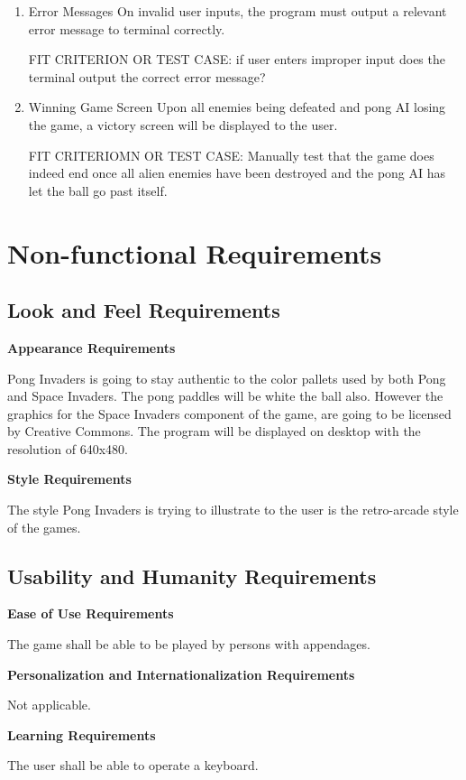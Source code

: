 \documentclass[12pt, titlepage]{article}
\begin{document}
\begin{enumerate}
\item Error Messages
On invalid user inputs, the program must output a relevant error message to
terminal correctly.

FIT CRITERION OR TEST CASE: if user enters improper input does the terminal
output the correct error message?

\item Winning Game Screen
Upon all enemies being defeated and pong AI losing the game, a victory screen will be displayed to the user. 

FIT CRITERIOMN OR TEST CASE: Manually test that the game does indeed end once all alien enemies have
been destroyed and the pong AI has let the ball go past itself.

\end{enumerate}

\section{Non-functional Requirements}
\subsection{Look and Feel Requirements}
\textbf{Appearance Requirements}

Pong Invaders is going to stay authentic to the color pallets used by both Pong
and Space Invaders. The pong paddles will be white the ball also. However the
graphics for the Space Invaders component of the game, are going to be licensed
by Creative Commons. The program will be displayed on desktop with the
resolution of 640x480.


\noindent \textbf{Style Requirements}

The style Pong Invaders is trying to illustrate to the user is the retro-arcade
style of the games. 

\subsection{Usability and Humanity Requirements}
\textbf{Ease of Use Requirements}

The game shall be able to be played by persons with appendages. 

\noindent \textbf{Personalization and Internationalization Requirements}

Not applicable. 

\noindent \textbf{Learning Requirements}

The user shall be able to operate a keyboard.
\end{document}

